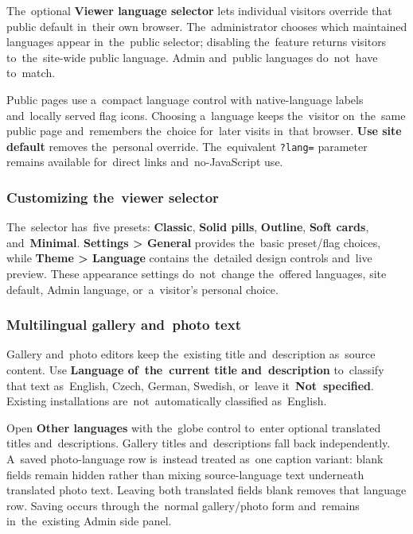 \documentclass[11pt,a4paper]{article}
\newcommand{\ui}[1]{\textbf{#1}}
\newcommand{\codeword}[1]{\nolinkurl{#1}}
\begin{document}
The~optional \ui{Viewer language selector} lets individual visitors override
that public default in~their own browser. The~administrator chooses which
maintained languages appear in~the~public selector; disabling the~feature
returns visitors to~the~site-wide public language. Admin and~public languages
do~not~have to~match.

Public pages use a~compact language control with native-language labels
and~locally served flag icons. Choosing a~language keeps the~visitor on~the~same
public page and~remembers the~choice for~later visits in~that browser. \ui{Use
site default} removes the~personal override. The~equivalent \codeword{?lang=}
parameter remains available for~direct links and~no-JavaScript use.

\subsubsection{Customizing the~viewer selector}

The~selector has~five presets: \ui{Classic}, \ui{Solid pills}, \ui{Outline},
\ui{Soft cards}, and~\ui{Minimal}. \ui{Settings > General} provides the~basic
preset/flag choices, while \ui{Theme > Language} contains the~detailed design
controls and~live preview. These appearance settings do~not~change the~offered
languages, site default, Admin language, or~a~visitor's personal choice.

\subsubsection{Multilingual gallery and~photo text}

Gallery and~photo editors keep the~existing title and~description as~source
content. Use \ui{Language of~the~current title and~description} to~classify that
text as~English, Czech, German, Swedish, or~leave it~\ui{Not~specified}.
Existing installations are~not~automatically classified as~English.

Open \ui{Other languages} with the~globe control to~enter optional translated
titles and~descriptions. Gallery titles and~descriptions fall back
independently. A~saved photo-language row is~instead treated as~one caption
variant: blank fields remain hidden rather than mixing source-language text
underneath translated photo text. Leaving both translated fields blank removes
that language row. Saving occurs through the~normal gallery/photo form
and~remains in~the~existing Admin side panel.
\end{document}

